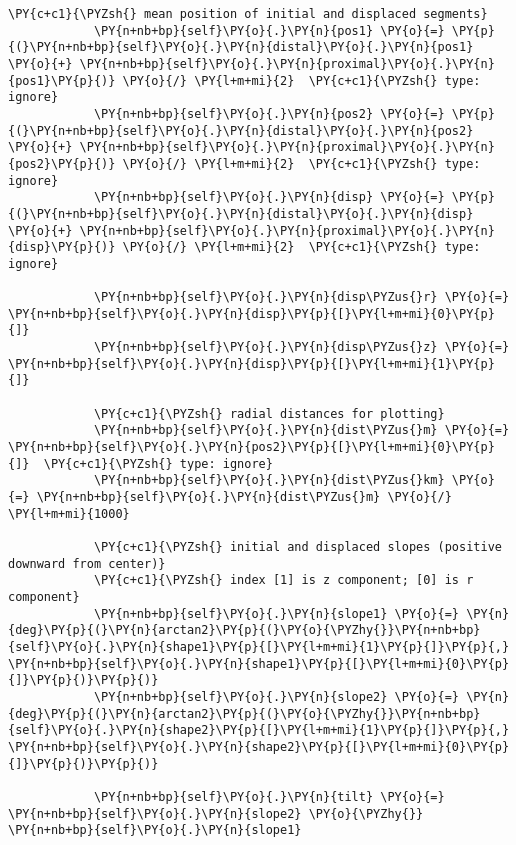 \begin{tcolorbox}[breakable, size=fbox, boxrule=1pt, pad at break*=1mm,colback=cellbackground, colframe=cellborder]
\begin{Verbatim}[commandchars=\\\{\}]
            \PY{c+c1}{\PYZsh{} mean position of initial and displaced segments}
            \PY{n+nb+bp}{self}\PY{o}{.}\PY{n}{pos1} \PY{o}{=} \PY{p}{(}\PY{n+nb+bp}{self}\PY{o}{.}\PY{n}{distal}\PY{o}{.}\PY{n}{pos1} \PY{o}{+} \PY{n+nb+bp}{self}\PY{o}{.}\PY{n}{proximal}\PY{o}{.}\PY{n}{pos1}\PY{p}{)} \PY{o}{/} \PY{l+m+mi}{2}  \PY{c+c1}{\PYZsh{} type: ignore}
            \PY{n+nb+bp}{self}\PY{o}{.}\PY{n}{pos2} \PY{o}{=} \PY{p}{(}\PY{n+nb+bp}{self}\PY{o}{.}\PY{n}{distal}\PY{o}{.}\PY{n}{pos2} \PY{o}{+} \PY{n+nb+bp}{self}\PY{o}{.}\PY{n}{proximal}\PY{o}{.}\PY{n}{pos2}\PY{p}{)} \PY{o}{/} \PY{l+m+mi}{2}  \PY{c+c1}{\PYZsh{} type: ignore}
            \PY{n+nb+bp}{self}\PY{o}{.}\PY{n}{disp} \PY{o}{=} \PY{p}{(}\PY{n+nb+bp}{self}\PY{o}{.}\PY{n}{distal}\PY{o}{.}\PY{n}{disp} \PY{o}{+} \PY{n+nb+bp}{self}\PY{o}{.}\PY{n}{proximal}\PY{o}{.}\PY{n}{disp}\PY{p}{)} \PY{o}{/} \PY{l+m+mi}{2}  \PY{c+c1}{\PYZsh{} type: ignore}
    
            \PY{n+nb+bp}{self}\PY{o}{.}\PY{n}{disp\PYZus{}r} \PY{o}{=} \PY{n+nb+bp}{self}\PY{o}{.}\PY{n}{disp}\PY{p}{[}\PY{l+m+mi}{0}\PY{p}{]}
            \PY{n+nb+bp}{self}\PY{o}{.}\PY{n}{disp\PYZus{}z} \PY{o}{=} \PY{n+nb+bp}{self}\PY{o}{.}\PY{n}{disp}\PY{p}{[}\PY{l+m+mi}{1}\PY{p}{]}
    
            \PY{c+c1}{\PYZsh{} radial distances for plotting}
            \PY{n+nb+bp}{self}\PY{o}{.}\PY{n}{dist\PYZus{}m} \PY{o}{=} \PY{n+nb+bp}{self}\PY{o}{.}\PY{n}{pos2}\PY{p}{[}\PY{l+m+mi}{0}\PY{p}{]}  \PY{c+c1}{\PYZsh{} type: ignore}
            \PY{n+nb+bp}{self}\PY{o}{.}\PY{n}{dist\PYZus{}km} \PY{o}{=} \PY{n+nb+bp}{self}\PY{o}{.}\PY{n}{dist\PYZus{}m} \PY{o}{/} \PY{l+m+mi}{1000}
    
            \PY{c+c1}{\PYZsh{} initial and displaced slopes (positive downward from center)}
            \PY{c+c1}{\PYZsh{} index [1] is z component; [0] is r component}
            \PY{n+nb+bp}{self}\PY{o}{.}\PY{n}{slope1} \PY{o}{=} \PY{n}{deg}\PY{p}{(}\PY{n}{arctan2}\PY{p}{(}\PY{o}{\PYZhy{}}\PY{n+nb+bp}{self}\PY{o}{.}\PY{n}{shape1}\PY{p}{[}\PY{l+m+mi}{1}\PY{p}{]}\PY{p}{,} \PY{n+nb+bp}{self}\PY{o}{.}\PY{n}{shape1}\PY{p}{[}\PY{l+m+mi}{0}\PY{p}{]}\PY{p}{)}\PY{p}{)}
            \PY{n+nb+bp}{self}\PY{o}{.}\PY{n}{slope2} \PY{o}{=} \PY{n}{deg}\PY{p}{(}\PY{n}{arctan2}\PY{p}{(}\PY{o}{\PYZhy{}}\PY{n+nb+bp}{self}\PY{o}{.}\PY{n}{shape2}\PY{p}{[}\PY{l+m+mi}{1}\PY{p}{]}\PY{p}{,} \PY{n+nb+bp}{self}\PY{o}{.}\PY{n}{shape2}\PY{p}{[}\PY{l+m+mi}{0}\PY{p}{]}\PY{p}{)}\PY{p}{)}
    
            \PY{n+nb+bp}{self}\PY{o}{.}\PY{n}{tilt} \PY{o}{=} \PY{n+nb+bp}{self}\PY{o}{.}\PY{n}{slope2} \PY{o}{\PYZhy{}} \PY{n+nb+bp}{self}\PY{o}{.}\PY{n}{slope1}
    

\end{Verbatim}
\end{tcolorbox}
